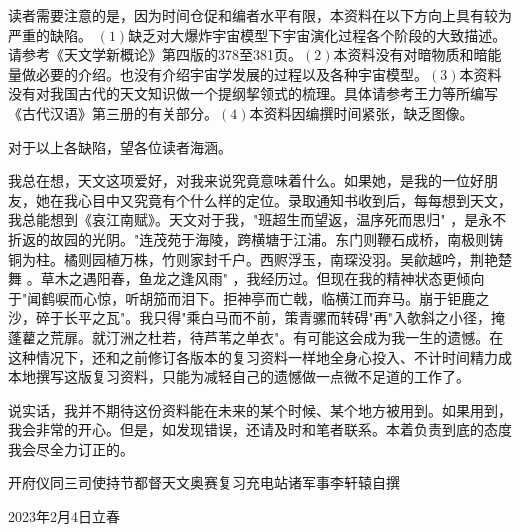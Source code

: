 读者需要注意的是，因为时间仓促和编者水平有限，本资料在以下方向上具有较为严重的缺陷。
$\left(1\right)$缺乏对大爆炸宇宙模型下宇宙演化过程各个阶段的大致描述。请参考《天文学新概论》第四版的378至381页。$\left(2\right)$本资料没有对暗物质和暗能量做必要的介绍。也没有介绍宇宙学发展的过程以及各种宇宙模型。$\left(3\right)$本资料没有对我国古代的天文知识做一个提纲挈领式的梳理。具体请参考王力等所编写《古代汉语》第三册的有关部分。$\left(4\right)$本资料因编撰时间紧张，缺乏图像。

对于以上各缺陷，望各位读者海涵。

我总在想，天文这项爱好，对我来说究竟意味着什么。如果她，是我的一位好朋友，她在我心目中又究竟有个什么样的定位。录取通知书收到后，每每想到天文，我总能想到《哀江南赋》。天文对于我，"班超生而望返，温序死而思归"
，是永不折返的故园的光阴。"连茂苑于海陵，跨横塘于江浦。东门则鞭石成桥，南极则铸铜为柱。橘则园植万株，竹则家封千户。西赆浮玉，南琛没羽。吴歈越吟，荆艳楚舞 。草木之遇阳春，鱼龙之逢风雨" ，我经历过。但现在我的精神状态更倾向于"闻鹤唳而心惊，听胡笳而泪下。拒神亭而亡戟，临横江而弃马。崩于钜鹿之沙，碎于长平之瓦"。我只得"乘白马而不前，策青骡而转碍"再"入欹斜之小径，掩蓬藋之荒扉。就汀洲之杜若，待芦苇之单衣"。有可能这会成为我一生的遗憾。在这种情况下，还和之前修订各版本的复习资料一样地全身心投入、不计时间精力成本地撰写这版复习资料，只能为减轻自己的遗憾做一点微不足道的工作了。

说实话，我并不期待这份资料能在未来的某个时候、某个地方被用到。如果用到，我会非常的开心。但是，如发现错误，还请及时和笔者联系。本着负责到底的态度我会尽全力订正的。
\begin{flushright}
	
开府仪同三司\quad 使持节都督天文奥赛复习充电站诸军事\quad 李轩辕\quad 自撰
\end{flushright}

\begin{flushright}
	2023年2月4日\qquad 立春
\end{flushright}